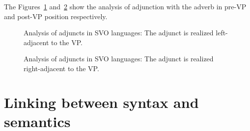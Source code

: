 The Figures~\ref{fig-adj-vp} and~\ref{fig-vp-adj} show the analysis of adjunction with the adverb in
pre-VP and post-VP position respectively.
\begin{figure}
\caption{\label{fig-adj-vp}Analysis of adjuncts in SVO languages: The adjunct is realized left-adjacent to the VP.}
\end{figure}
\begin{figure}
\caption{\label{fig-vp-adj}Analysis of adjuncts in SVO languages: The adjunct is realized right-adjacent to the VP.}
\end{figure}


\section{Linking between syntax and semantics}
\label{sec-linking}

